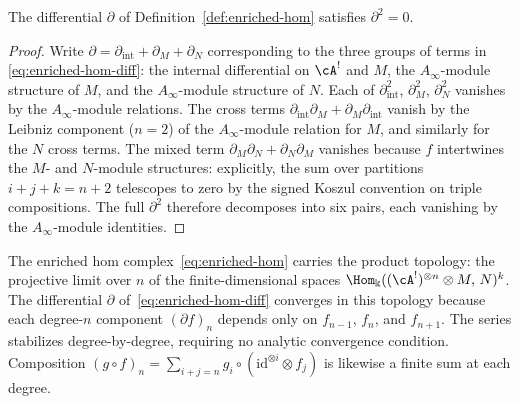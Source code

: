 \begin{proposition}[$\partial^2=0$ on the enriched hom;
\ClaimStatusProvedHere]
The differential $\partial$ of
Definition~\textup{\ref{def:enriched-hom}} satisfies
$\partial^2=0$.
\end{proposition}

\begin{proof}
Write $\partial=\partial_{\mathrm{int}}+\partial_M+\partial_N$
corresponding to the three groups of terms in
\eqref{eq:enriched-hom-diff}: the internal differential
on $\cA^!$ and $M$, the $A_\infty$-module structure of $M$,
and the $A_\infty$-module structure of $N$. Each of
$\partial_{\mathrm{int}}^2$, $\partial_M^2$, $\partial_N^2$
vanishes by the $A_\infty$-module relations. The cross terms
$\partial_{\mathrm{int}}\partial_M+\partial_M\partial_{\mathrm{int}}$
vanish by the Leibniz component ($n=2$) of the
$A_\infty$-module relation for $M$, and similarly for the
$N$ cross terms. The mixed term
$\partial_M\partial_N+\partial_N\partial_M$ vanishes because
$f$ intertwines the $M$- and $N$-module structures:
explicitly, the sum over partitions $i+j+k=n+2$
telescopes to zero by the signed Koszul convention on
triple compositions. The full $\partial^2$ therefore
decomposes into six pairs, each vanishing by the
$A_\infty$-module identities.
\end{proof}

\begin{remark}
The enriched hom complex~\eqref{eq:enriched-hom} carries
the product topology: the projective limit over $n$ of
the finite-dimensional spaces
$\Hom_\Bbbk((\cA^!)^{\otimes n}\otimes M,\,N)^k$. The
differential $\partial$
of~\eqref{eq:enriched-hom-diff} converges in this topology
because each degree-$n$ component $(\partial f)_n$ depends
only on $f_{n-1}$, $f_n$, and $f_{n+1}$. The series
stabilizes degree-by-degree, requiring no analytic convergence
condition. Composition
$(g\circ f)_n = \sum_{i+j=n}g_i\circ(\mathrm{id}^{\otimes i}
\otimes f_j)$ is likewise a finite sum at each degree.
\end{remark}

